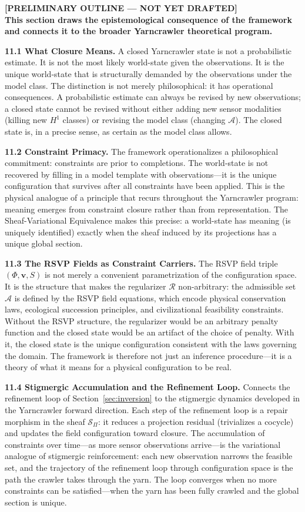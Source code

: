 \documentclass[12pt, oneside]{article}
\newcommand{\preliminary}[1]{%
  \colorbox{yellow!20}{\parbox{\dimexpr\linewidth-2\fboxsep}{%
    \textbf{\textcolor{red!70!black}{[PRELIMINARY OUTLINE --- NOT YET DRAFTED]}}\\[4pt]
    #1
  }}%
}
\begin{document}
\preliminary{
\textbf{This section draws the epistemological consequence of the framework and connects
it to the broader Yarncrawler theoretical program.}

\medskip
\textbf{11.1 What Closure Means.}
A closed Yarncrawler state is not a probabilistic estimate. It is not the most likely
world-state given the observations. It is the unique world-state that is structurally
demanded by the observations under the model class. The distinction is not merely
philosophical: it has operational consequences. A probabilistic estimate can always be
revised by new observations; a closed state cannot be revised without either adding new
sensor modalities (killing new $H^1$ classes) or revising the model class (changing
$\mathcal{A}$). The closed state is, in a precise sense, as certain as the model class
allows.

\medskip
\textbf{11.2 Constraint Primacy.}
The framework operationalizes a philosophical commitment: constraints are prior to
completions. The world-state is not recovered by filling in a model template with
observations---it is the unique configuration that survives after all constraints have
been applied. This is the physical analogue of a principle that recurs throughout the
Yarncrawler program: meaning emerges from constraint closure rather than from
representation. The Sheaf-Variational Equivalence makes this precise: a world-state has
meaning (is uniquely identified) exactly when the sheaf induced by its projections has a
unique global section.

\medskip
\textbf{11.3 The RSVP Fields as Constraint Carriers.}
The RSVP field triple $(\Phi, \mathbf{v}, S)$ is not merely a convenient parametrization
of the configuration space. It is the structure that makes the regularizer $\mathcal{R}$
non-arbitrary: the admissible set $\mathcal{A}$ is defined by the RSVP field equations,
which encode physical conservation laws, ecological succession principles, and
civilizational feasibility constraints. Without the RSVP structure, the regularizer would
be an arbitrary penalty function and the closed state would be an artifact of the choice
of penalty. With it, the closed state is the unique configuration consistent with the laws
governing the domain. The framework is therefore not just an inference procedure---it is
a theory of what it means for a physical configuration to be real.

\medskip
\textbf{11.4 Stigmergic Accumulation and the Refinement Loop.}
Connects the refinement loop of Section~\ref{sec:inversion} to the stigmergic dynamics
developed in the Yarncrawler forward direction. Each step of the refinement loop is a
repair morphism in the sheaf $\mathcal{S}_\Pi$: it reduces a projection residual
(trivializes a cocycle) and updates the field configuration toward closure. The
accumulation of constraints over time---as more sensor observations arrive---is the
variational analogue of stigmergic reinforcement: each new observation narrows the
feasible set, and the trajectory of the refinement loop through configuration space is
the path the crawler takes through the yarn. The loop converges when no more constraints
can be satisfied---when the yarn has been fully crawled and the global section is unique.

}
\end{document}
